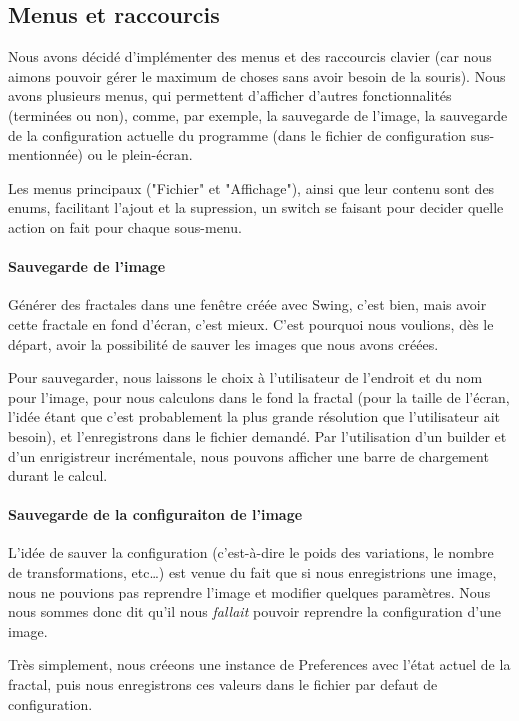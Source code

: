 \documentclass[a4paper]{article}
\begin{document}
\subsection*{Menus et raccourcis}
Nous avons décidé d'implémenter des menus et des raccourcis clavier (car nous aimons pouvoir gérer le maximum de choses sans avoir besoin de la souris). Nous avons plusieurs menus, qui permettent d'afficher d'autres fonctionnalités (terminées ou non), comme, par exemple, la sauvegarde de l'image, la sauvegarde de la configuration actuelle du programme (dans le fichier de configuration sus-mentionnée) ou le plein-écran.

Les menus principaux ("Fichier" et "Affichage"), ainsi que leur contenu sont des enums, facilitant l'ajout et la supression, un switch se faisant pour decider quelle action on fait pour chaque sous-menu.

\paragraph{Sauvegarde de l'image}
Générer des fractales dans une fenêtre créée avec Swing, c'est bien, mais avoir cette fractale en fond d'écran, c'est mieux. C'est pourquoi nous voulions, dès le départ, avoir la possibilité de sauver les images que nous avons créées.

Pour sauvegarder, nous laissons le choix à l'utilisateur de l'endroit et du nom pour l'image, pour nous calculons dans le fond la fractal (pour la taille de l'écran, l'idée étant que c'est probablement la plus grande résolution que l'utilisateur ait besoin), et l'enregistrons dans le fichier demandé. Par l'utilisation d'un builder et d'un enrigistreur incrémentale, nous pouvons afficher une barre de chargement durant le calcul.

\paragraph{Sauvegarde de la configuraiton de l'image}
L'idée de sauver la configuration (c'est-à-dire le poids des variations, le nombre de transformations, etc\ldots) est venue du fait que si nous enregistrions une image, nous ne pouvions pas reprendre l'image et modifier quelques paramètres. Nous nous sommes donc dit qu'il nous \textit{fallait} pouvoir reprendre la configuration d'une image.

Très simplement, nous créeons une instance de Preferences avec l'état actuel de la fractal, puis nous enregistrons ces valeurs dans le fichier par defaut de configuration.
\end{document}
